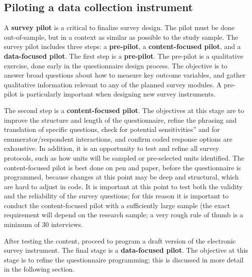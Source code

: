 \subsection{Piloting a data collection instrument}
A \textbf{survey pilot}
is a critical to finalize survey design.
The pilot must be done out-of-sample,
but in a context as similar as possible to the study sample.
The survey pilot includes three steps:
a \textbf{pre-pilot}, a \textbf{content-focused pilot}, and a \textbf{data-focused pilot}.
The first step is a \textbf{pre-pilot}.
The pre-pilot is a qualitative exercise, done early in the questionnaire design process.
The objective is to answer broad questions about how to measure key outcome variables,
and gather qualitative information relevant to any of the planned survey modules.
A pre-pilot is particularly important when designing new survey instruments.

The second step is a \textbf{content-focused pilot}.
The objectives at this stage are to improve the structure and length of the questionnaire,
refine the phrasing and translation of specific questions,
check for potential sensitivities” and for enumerator/respondent interactions,
and confirm coded response options are exhaustive.
In addition, it is an opportunity to test and refine all survey protocols,
such as how units will be sampled or pre-selected units identified.
The content-focused pilot is best done on pen and paper, before the questionnaire is programmed,
because changes at this point may be deep and structural,
which are hard to adjust in code.
It is important at this point to test both the validity and the reliability 
of the survey questions; 
for this reason it is important to conduct the content-focused pilot
with a sufficiently large sample (the exact requirement will depend on the research sample;
a very rough rule of thumb is a minimum of 30 interviews.

After testing the content, proceed to program a draft version
of the electronic survey instrument.
The final stage is a \textbf{data-focused pilot}.
The objective at this stage is to refine the questionnaire programming;
this is discussed in more detail in the following section.


